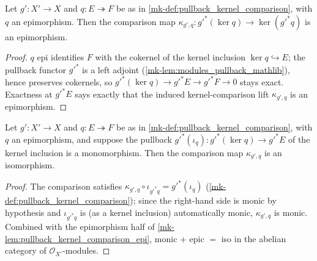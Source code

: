 \begin{lemma}\label{mk-lem:pullback_kernel_comparison_epi}
  \leanok

  Let \(g' : X' \to X\) and \(q : E \twoheadrightarrow F\) be as in
  \ref{mk-def:pullback_kernel_comparison}, with \(q\) an epimorphism. Then the
  comparison map \(\kappa_{g',q} : g'^{*}(\ker q) \to \ker(g'^{*} q)\) is an
  epimorphism.
\end{lemma}
\begin{proof}
  \leanok\(q\) epi identifies \(F\) with the cokernel of the kernel inclusion
  \(\ker q \hookrightarrow E\); the pullback functor \(g'^{*}\) is a left
  adjoint (\ref{mk-lem:modules_pullback_mathlib}), hence preserves cokernels,
  so \(g'^{*}(\ker q) \to g'^{*}E \to g'^{*}F \to 0\) stays exact. Exactness
  at \(g'^{*}E\) says exactly that the induced kernel-comparison lift
  \(\kappa_{g',q}\) is an epimorphism.
\end{proof}

\begin{lemma}\label{mk-lem:pullback_kernel_comparison_iso_of_mono}
  \leanok

  Let \(g' : X' \to X\) and \(q : E \twoheadrightarrow F\) be as in
  \ref{mk-def:pullback_kernel_comparison}, with \(q\) an epimorphism, and
  suppose the pullback \(g'^{*}(\iota_q) : g'^{*}(\ker q) \to g'^{*}E\) of
  the kernel inclusion is a monomorphism. Then the comparison map
  \(\kappa_{g',q}\) is an isomorphism.
\end{lemma}
\begin{proof}
  \leanok{}
  The comparison satisfies \(\kappa_{g',q} \circ \iota_{g'^{*}q} =
  g'^{*}(\iota_q)\) (\ref{mk-def:pullback_kernel_comparison}); since the
  right-hand side is monic by hypothesis and \(\iota_{g'^{*}q}\) is (as a
  kernel inclusion) automatically monic, \(\kappa_{g',q}\) is monic.
  Combined with the epimorphism half of
  \ref{mk-lem:pullback_kernel_comparison_epi}, monic \(+\) epic \(=\) iso in
  the abelian category of \(\mathcal O_{X'}\)-modules.
\end{proof}

